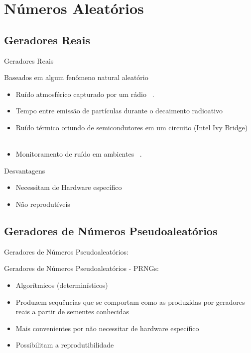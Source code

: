 \documentclass[xcolor=dvipsnames]{beamer}
\begin{document}
\section{Números Aleatórios}
\subsection{Geradores Reais}
  \begin{frame}{Geradores Reais}
    \begin{block}{Baseados em algum fenômeno natural aleatório}
      \begin{itemize}
	\item Ruído atmosférico capturado por um rádio ~\cite[(random.org)]{RANDOM.ORG}.
	\pause
	\item Tempo entre emissão de partículas durante o decaimento radioativo ~\cite[HOTBITS]{HOTBITS}
	\pause
	\item Ruído térmico oriundo de semicondutores em um circuito (Intel Ivy Bridge)~\cite[]{IVY.REPORT} ~\cite[]{IVY.TROJAN}
	\pause
	\item Monitoramento de ruído em ambientes ~\cite{audio.entropy}.
	\pause
      \end{itemize}
    \end{block}
    \begin{block}{Desvantagens}
      \begin{itemize}
	\item Necessitam de Hardware específico
	\pause
	\item Não reprodutíveis
      \end{itemize}
    \end{block}
  \end{frame}

\subsection{Geradores de Números Pseudoaleatórios}
\begin{frame}{Geradores de Números Pseudoaleatórios:}
  \begin{block}{Geradores de Números Pseudoaleatórios - PRNGs:}
    \begin{itemize}
      \item Algorítmicos (determinísticos)
      \pause
      \item Produzem sequências que se comportam como as produzidas por geradores reais a partir de sementes conhecidas~\cite{LEcuyer:98}
      \pause
      \item Mais convenientes por não necessitar de hardware específico
      \pause
      \item Possibilitam a reprodutibilidade
      \pause
    \end{itemize}
  \end{block}
\end{frame}
\end{document}

